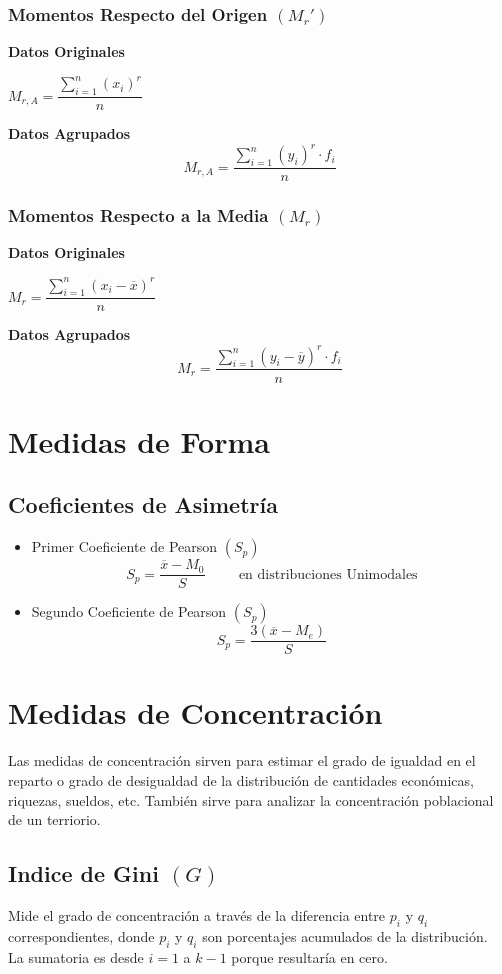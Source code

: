 \subsubsection{Momentos Respecto del Origen $(M_r')$}
\begin{multicols}{2}
\textbf{Datos Originales} 
\begin{center}
$M_{r,A}=\dfrac{\displaystyle\sum_{i=1}^{n}(x_i)^r}{n}$
\end{center}
\columnbreak
\textbf{Datos Agrupados}
$$M_{r,A}=\dfrac{\displaystyle\sum_{i=1}^{n}(y_i)^r\cdot f_i}{n}$$
\end{multicols}
\subsubsection{Momentos Respecto a la Media $(M_r)$}
\begin{multicols}{2}
\textbf{Datos Originales} 
\begin{center}
$M_{r}=\dfrac{\displaystyle\sum_{i=1}^{n}(x_i-\overline{x})^r}{n}$
\end{center}
\columnbreak
\textbf{Datos Agrupados}
$$M_{r}=\dfrac{\displaystyle\sum_{i=1}^{n}(y_i-\overline{y})^r\cdot f_i}{n}$$
\end{multicols}
\section{Medidas de Forma}
\subsection{Coeficientes de Asimetría}
\begin{itemize}
\item Primer Coeficiente de Pearson $(S_p)$
$$S_p=\dfrac{\overline{x}-M_0}{S} \hspace{1cm} \textrm{en distribuciones Unimodales}$$
\item Segundo Coeficiente de Pearson $(S_p)$
$$S_p=\dfrac{3(\overline{x}-M_e)}{S}$$
\end{itemize}
\section{Medidas de Concentración}
Las medidas de concentración sirven para estimar el grado de igualdad en el reparto o grado de desigualdad de la distribución de cantidades económicas, riquezas, sueldos, etc. También sirve para analizar la concentración poblacional de un terriorio.
\subsection{Indice de Gini $(G)$}
Mide el grado de concentración a través de la diferencia entre $p_i$ y $q_i$ correspondientes, donde $p_i$ y $q_i$ son porcentajes acumulados de la distribución.\\${ }$\\La sumatoria es desde $i=1$ a $k-1$ porque resultaría en cero.
